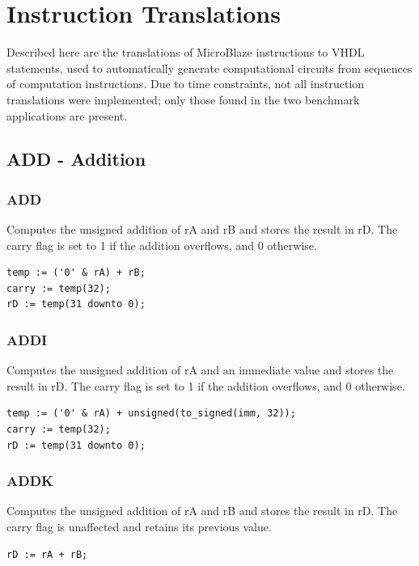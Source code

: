\documentclass{UoYCSproject}
\begin{document}
\appendix

\chapter{Instruction Translations}

Described here are the translations of MicroBlaze instructions to VHDL statements, used to automatically
generate computational circuits from sequences of computation instructions. Due to time constraints, not all
instruction translations were implemented; only those found in the two benchmark applications are present.

\section{ADD - Addition}

\subsection{ADD}

Computes the unsigned addition of rA and rB and stores the result in rD. The carry flag is set to 1 if the addition
overflows, and 0 otherwise.

\begin{lstlisting}
temp := ('0' & rA) + rB;
carry := temp(32);
rD := temp(31 downto 0);
\end{lstlisting}

\subsection{ADDI}

Computes the unsigned addition of rA and an immediate value and stores the result in rD. The carry flag is set to 1 if the
addition overflows, and 0 otherwise.

\begin{lstlisting}
temp := ('0' & rA) + unsigned(to_signed(imm, 32));
carry := temp(32);
rD := temp(31 downto 0);
\end{lstlisting}

\subsection{ADDK}

Computes the unsigned addition of rA and rB and stores the result in rD. The carry flag is unaffected and retains its previous
value.

\begin{lstlisting}
rD := rA + rB;
\end{lstlisting}
\end{document}

